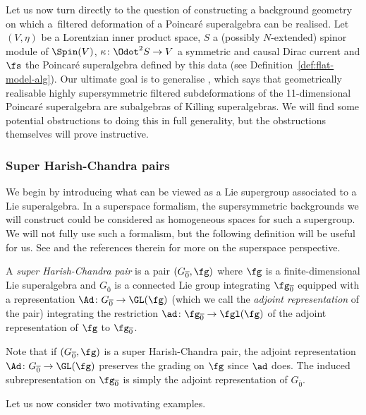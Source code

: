 Let us now turn directly to the question of constructing a background geometry on which a~filtered deformation of a Poincar\'e superalgebra can be realised. Let $(V,\eta)$ be a Lorentzian inner product space, $S$ a (possibly $N$-extended) spinor module of $\Spin(V)$, $\kappa\colon \Odot^2 S\to V$ a symmetric and causal Dirac current and $\fs$ the Poincar\'e superalgebra defined by this data (see Definition~\ref{def:flat-model-alg}). Our ultimate goal is to generalise \cite[Theorem~13]{Figueroa-OFarrill2017_1}, which says that geometrically realisable highly supersymmetric filtered subdeformations of the 11-dimensional Poincar\'e superalgebra are subalgebras of Killing superalgebras. We will find some potential obstructions to doing this in full generality, but the obstructions themselves will prove instructive.

\subsubsection{Super Harish-Chandra pairs}

We begin by introducing what can be viewed as a Lie supergroup associated to a Lie superalgebra. In a superspace formalism, the supersymmetric backgrounds we will construct could be considered as homogeneous spaces for such a supergroup. We will not fully use such a formalism, but the following definition will be useful for us. See \cite{Santi2010} and the references therein for more on the superspace perspective.

\begin{Definition}\label{def:super-Harish-Chandra}
	A \emph{super Harish-Chandra pair} is a pair $(G_{\overline0},\fg)$ where $\fg$ is a finite-dimensional Lie superalgebra and $G_{\overline0}$ is a connected Lie group integrating $\fg_{\overline0}$ equipped with a representation $\Ad\colon G_{\overline0}\to\GL(\fg)$ (which we call the \emph{adjoint representation} of the pair) integrating the restriction $\ad\colon\fg_{\overline0}\to\fgl(\fg)$ of the adjoint representation of $\fg$ to $\fg_{\overline0}$.
\end{Definition}

Note that if $(G_{\overline0},\fg)$ is a super Harish-Chandra pair, the adjoint representation $\Ad\colon G_{\overline0}\to\GL(\fg)$ preserves the grading on $\fg$ since $\ad$ does. The induced subrepresentation on $\fg_{\overline0}$ is simply the adjoint representation of $G_{\overline0}$.

Let us now consider two motivating examples.

